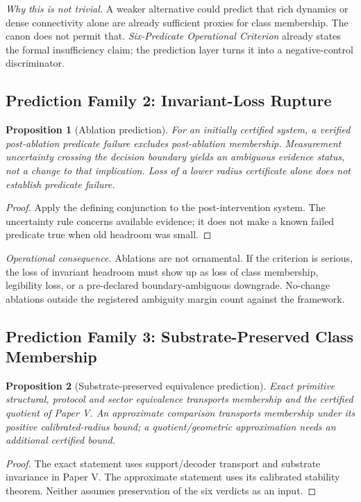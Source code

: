 \documentclass[11pt,a4paper]{article}
\newtheorem{proposition}{Proposition}[section]
\begin{document}
\noindent\textit{Why this is not trivial.} A weaker alternative could predict that rich dynamics or dense connectivity alone are already sufficient proxies for class membership. The canon does not permit that. \textit{Six-Predicate Operational Criterion} already states the formal insufficiency claim; the prediction layer turns it into a negative-control discriminator.

\subsection{Prediction Family 2: Invariant-Loss Rupture}
\begin{proposition}[Ablation prediction]\label{prop:ablation-contract}
For an initially certified system, a verified post-ablation predicate failure excludes post-ablation membership. Measurement uncertainty crossing the decision boundary yields an ambiguous evidence status, not a change to that implication. Loss of a lower radius certificate alone does not establish predicate failure.
\end{proposition}
\begin{proof}
Apply the defining conjunction to the post-intervention system. The uncertainty rule concerns available evidence; it does not make a known failed predicate true when old headroom was small.
\end{proof}

\noindent\textit{Operational consequence.} Ablations are not ornamental. If the criterion is serious, the loss of invariant headroom must show up as loss of class membership, legibility loss, or a pre-declared boundary-ambiguous downgrade. No-change ablations outside the registered ambiguity margin count against the framework.

\subsection{Prediction Family 3: Substrate-Preserved Class Membership}
\begin{proposition}[Substrate-preserved equivalence prediction]\label{prop:substrate-contract}
Exact primitive structural, protocol and sector equivalence transports membership and the certified quotient of Paper V. An approximate comparison transports membership under its positive calibrated-radius bound; a quotient/geometric approximation needs an additional certified bound.
\end{proposition}
\begin{proof}
The exact statement uses support/decoder transport and substrate invariance in Paper V. The approximate statement uses its calibrated stability theorem. Neither assumes preservation of the six verdicts as an input.
\end{proof}
\end{document}
